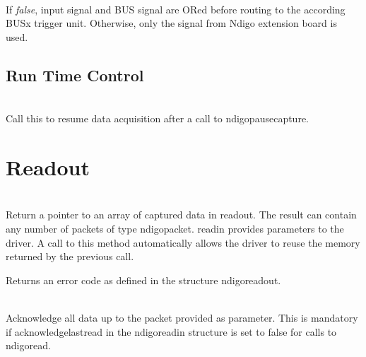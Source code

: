             \\
            If \textit{false}, input signal and BUS signal are ORed before routing to the according BUSx trigger unit. Otherwise, only the signal from Ndigo extension board is used.

        \subsection{Run Time Control}

            \par

            \par

            \\
            Call this to resume data acquisition after a call to \textsf{ndigo\tu pause\tu capture}.\par


    \section{Readout\label{cp:readout}}

          \\
        Return a pointer to an array of captured data in \textsf{read\tu out}. The result can contain any number of packets of type \textsf{ndigo\tu packet}. \textsf{read\tu in} provides parameters to the driver. A call to this method automatically allows the driver to reuse the memory returned by the previous call.\par

Returns an error code as defined in the structure \textsf{ndigo\tu read\tu out}.\par

         \\
        Acknowledge all data up to the packet provided as parameter. This is mandatory if \textsf{acknowledge\tu last\tu read} in the \textsf{ndigo\tu read\tu in} structure is set to false for calls to \textsf{ndigo\tu read}.\par


